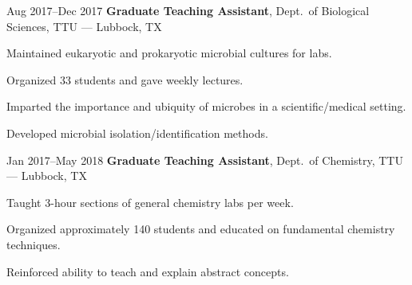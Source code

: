 \documentclass{resume}
\begin{document}
        \begin{twocolentry}{Aug 2017--Dec 2017}
            \textbf{Graduate Teaching Assistant}, Dept.\ of Biological Sciences, TTU --- Lubbock, TX
        \end{twocolentry}
        \vspace{0.10cm}
        \begin{onecolentry}
            \begin{highlights}
                \item Maintained eukaryotic and prokaryotic microbial cultures for labs.
                \item Organized 33 students and gave weekly lectures.
                \item Imparted the importance and ubiquity of microbes in a scientific/medical setting.
                \item Developed microbial isolation/identification methods.
            \end{highlights}
        \end{onecolentry}
        \vspace{0.2cm}

        \begin{twocolentry}{Jan 2017--May 2018}
            \textbf{Graduate Teaching Assistant}, Dept.\ of Chemistry, TTU --- Lubbock, TX
        \end{twocolentry}
        \vspace{0.10cm}
        \begin{onecolentry}
            \begin{highlights}
                \item Taught 3-hour sections of general chemistry labs per week.
                \item Organized approximately 140 students and educated on fundamental chemistry techniques.
                \item Reinforced ability to teach and explain abstract concepts.
            \end{highlights}
        \end{onecolentry}
\end{document}

